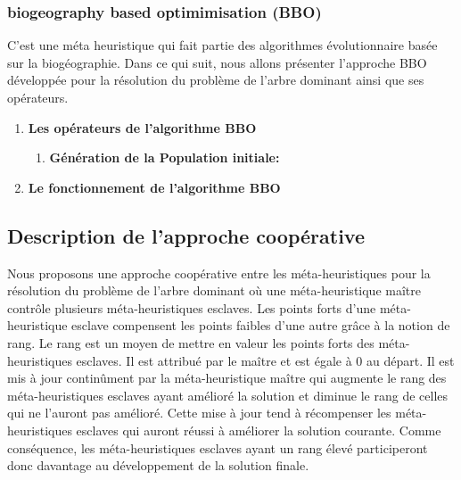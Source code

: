 \subsubsection{biogeography based optimimisation (BBO)}
C’est une méta heuristique qui fait partie des algorithmes évolutionnaire basée sur la biogéographie. Dans ce qui suit, nous allons présenter l’approche BBO développée pour la résolution du problème de l’arbre dominant ainsi que ses opérateurs.

\begin{enumerate}
	\item \textbf{Les opérateurs de l’algorithme BBO}\\
	\begin{enumerate}[label=\alph*)]
		\item \textbf{Génération de la Population initiale:}\\
	\end{enumerate}	
	
	\item \textbf{Le fonctionnement de l’algorithme BBO}\\
	
	
\end{enumerate}



\subsection{Description de l'approche coopérative}
Nous proposons une approche  coopérative entre les méta-heuristiques pour la résolution du problème de l’arbre dominant où une méta-heuristique maître contrôle plusieurs méta-heuristiques esclaves. Les points forts d'une méta-heuristique esclave compensent les points faibles d'une autre grâce à la notion de rang. Le rang est un moyen de mettre en valeur les points forts des méta-heuristiques esclaves. Il est attribué par le maître et est égale à 0 au départ. Il est mis à jour continûment par la méta-heuristique maître qui augmente le rang des méta-heuristiques esclaves ayant amélioré la solution et diminue le rang de celles qui ne l'auront pas amélioré. Cette mise à jour tend à récompenser les méta-heuristiques esclaves qui auront réussi à améliorer la solution courante. Comme conséquence, les méta-heuristiques esclaves ayant un rang élevé participeront donc davantage au développement de la solution finale.

